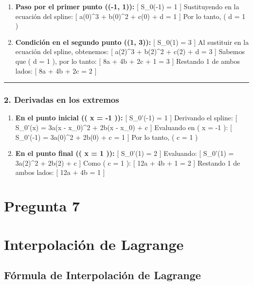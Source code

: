 \documentclass[
  letterpaper,
  DIV=11,
  numbers=noendperiod]{scrartcl}
\begin{document}
\begin{enumerate}
\def\labelenumi{\arabic{enumi}.}
\item
  \textbf{Paso por el primer punto ((-1, 1)):} {[} S\_0(-1) = 1 {]}
  Sustituyendo en la ecuación del spline: {[} a(0)\^{}3 + b(0)\^{}2 +
  c(0) + d = 1 {]} Por lo tanto, ( d = 1 )
\item
  \textbf{Condición en el segundo punto ((1, 3)):} {[} S\_0(1) = 3 {]}
  Al sustituir en la ecuación del spline, obtenemos: {[} a(2)\^{}3 +
  b(2)\^{}2 + c(2) + d = 3 {]} Sabemos que ( d = 1 ), por lo tanto: {[}
  8a + 4b + 2c + 1 = 3 {]} Restando 1 de ambos lados: {[} 8a + 4b + 2c =
  2 {]}
\end{enumerate}

\begin{center}\rule{0.5\linewidth}{0.5pt}\end{center}

\subsubsection{2. Derivadas en los
extremos}\label{derivadas-en-los-extremos}

\begin{enumerate}
\def\labelenumi{\arabic{enumi}.}
\item
  \textbf{En el punto inicial (( x = -1 )):} {[} S\_0'(-1) = 1 {]}
  Derivando el spline: {[} S\_0'(x) = 3a(x - x\_0)\^{}2 + 2b(x - x\_0) +
  c {]} Evaluando en ( x = -1 ): {[} S\_0'(-1) = 3a(0)\^{}2 + 2b(0) + c
  = 1 {]} Por lo tanto, ( c = 1 )
\item
  \textbf{En el punto final (( x = 1 )):} {[} S\_0'(1) = 2 {]}
  Evaluando: {[} S\_0'(1) = 3a(2)\^{}2 + 2b(2) + c {]} Como ( c = 1 ):
  {[} 12a + 4b + 1 = 2 {]} Restando 1 de ambos lados: {[} 12a + 4b = 1
  {]}
\end{enumerate}

\section{Pregunta 7}\label{pregunta-7}

\section{Interpolación de Lagrange}\label{interpolaciuxf3n-de-lagrange}

\subsection{Fórmula de Interpolación de
Lagrange}\label{fuxf3rmula-de-interpolaciuxf3n-de-lagrange}
\end{document}
